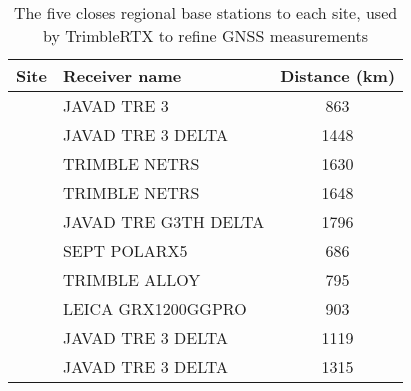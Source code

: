 \begin{table}[]
\centering
\caption{The five closes regional base stations to each site, used by TrimbleRTX to refine GNSS measurements} 
\label{auspos_close}
\begin{tabular}{llS[table-format=4.0]}
  \toprule
{Site} & {Receiver name} & {Distance (km)} \\ 
  \midrule
{} & JAVAD TRE 3 & 863 \\ 
   & JAVAD TRE 3 DELTA & 1448 \\ 
   & TRIMBLE NETRS & 1630 \\ 
   & TRIMBLE NETRS & 1648 \\ 
   & JAVAD TRE G3TH DELTA & 1796 \\ 
  {} & SEPT POLARX5 & 686 \\ 
   & TRIMBLE ALLOY & 795 \\ 
   & LEICA GRX1200GGPRO & 903 \\ 
   & JAVAD TRE 3 DELTA & 1119 \\ 
   & JAVAD TRE 3 DELTA & 1315 \\ 
   \bottomrule
\end{tabular}
\end{table}

